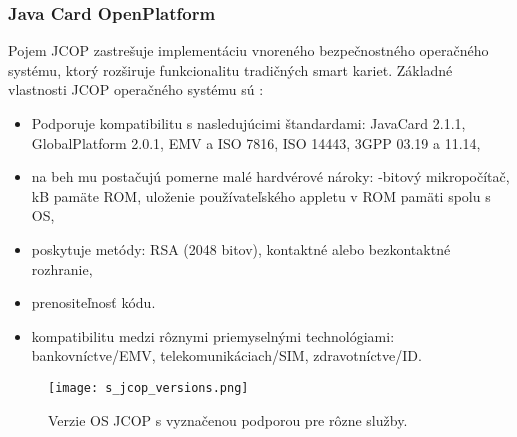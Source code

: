 \documentclass[12pt,a4wide,oneside,openright]{report}
\begin{document}
\subsubsection{Java Card OpenPlatform} \label{s_jcop}
Pojem JCOP zastrešuje implementáciu vnoreného bezpečnostného operačného systému, ktorý rozširuje funkcionalitu tradičných smart kariet. \cite{jcopz} 
Základné vlastnosti JCOP operačného systému sú \cite{jcop}:
\singlespacing
\begin{itemize}
	\item Podporuje kompatibilitu s nasledujúcimi štandardami:
	\subitem JavaCard 2.1.1,
	\subitem GlobalPlatform 2.0.1,
	\subitem EMV a ISO 7816,
	\subitem ISO 14443,
	\subitem 3GPP 03.19 a 11.14,
	\item na beh mu postačujú pomerne malé hardvérové nároky:
	-bitový mikropočítač,
	 kB pamäte ROM,
	\subitem uloženie používateľského appletu v ROM pamäti spolu s OS,
	\item poskytuje metódy:
	\subitem RSA (2048 bitov),
	\subitem kontaktné alebo bezkontaktné rozhranie,
	\item prenositeľnosť kódu.
	\item kompatibilitu medzi rôznymi priemyselnými technológiami:
	\subitem bankovníctve/EMV,
	\subitem telekomunikáciach/SIM,
	\subitem zdravotníctve/ID.
\end{itemize}
\onehalfspacing

\begin{figure*}[h]
	\centering
	\texttt{[image: s\_jcop\_versions.png]}
	\caption{Verzie OS JCOP s vyznačenou podporou pre rôzne služby. \cite{jcop}}
	\label{f:o_jcop_0}
\end{figure*}
%
\end{document}
